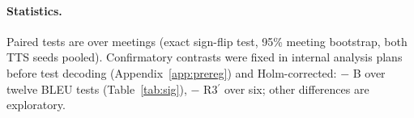 \paragraph{Statistics.} Paired tests are over meetings (exact sign-flip test, 95\% meeting bootstrap, both TTS seeds
pooled). Confirmatory contrasts were fixed in internal analysis plans before test decoding (Appendix~\ref{app:prereg})
and Holm-corrected: \sys{} $-$ B over twelve BLEU tests (Table~\ref{tab:sig}), \sys{} $-$ R3$^\prime$ over six; other
differences are exploratory.
